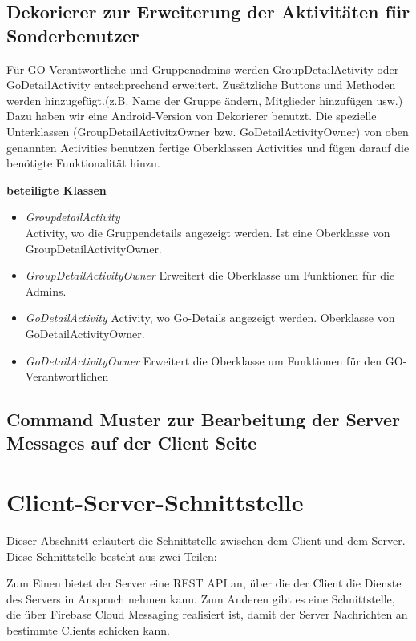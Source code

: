 \subsection{Dekorierer zur Erweiterung der Aktivitäten für Sonderbenutzer}
Für GO-Verantwortliche und Gruppenadmins werden GroupDetailActivity oder GoDetailActivity entschprechend erweitert. Zusätzliche Buttons und Methoden werden hinzugefügt.(z.B. Name der Gruppe ändern, Mitglieder hinzufügen usw.) Dazu haben wir eine Android-Version von Dekorierer benutzt. Die spezielle Unterklassen (GroupDetailActivitzOwner bzw. GoDetailActivityOwner) von oben genannten Activities benutzen fertige Oberklassen Activities und fügen darauf die benötigte Funktionalität hinzu.

\textbf{beteiligte Klassen}
\begin{itemize}
\item \textit{GroupdetailActivity} \\
Activity, wo die Gruppendetails angezeigt werden. Ist eine Oberklasse von GroupDetailActivityOwner.
\item \textit{GroupDetailActivityOwner}
Erweitert die Oberklasse um Funktionen für die Admins.
\item \textit{GoDetailActivity}
Activity, wo Go-Details angezeigt werden. Oberklasse von GoDetailActivityOwner.
\item \textit{GoDetailActivityOwner}
Erweitert die Oberklasse um Funktionen für den GO-Verantwortlichen
\end{itemize}


\subsection{Command Muster zur Bearbeitung der Server Messages auf der Client Seite}


\newpage

\section{Client-Server-Schnittstelle}
Dieser Abschnitt erläutert die Schnittstelle zwischen dem Client und dem Server. Diese Schnittstelle besteht aus zwei Teilen:

Zum Einen bietet der Server eine REST API an, über die der Client die Dienste des Servers in Anspruch nehmen kann. Zum Anderen gibt es eine Schnittstelle, die über Firebase Cloud Messaging realisiert ist, damit der Server Nachrichten an bestimmte Clients schicken kann.

